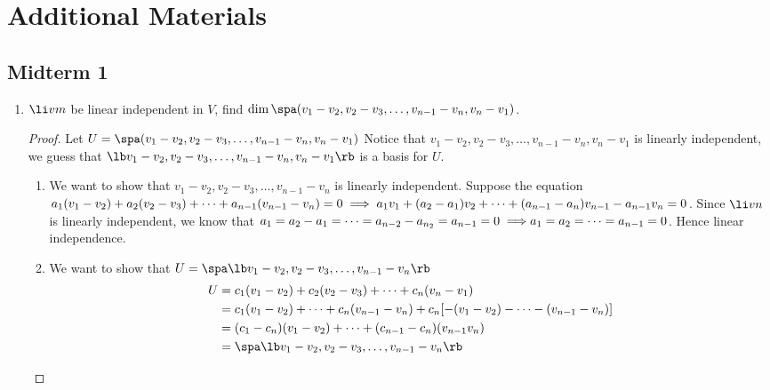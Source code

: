 \thispagestyle{empty}
\section*{Additional Materials}
\subsection*{Midterm 1}
\begin{enumerate}
    \item $\li vm$ be linear independent in $V$, find $\dim \spa (v_1 - v_2, v_2 - v_3, \ldots, v_{n-1} - v_n, v_n - v_1)$. 
    \begin{proof}
        Let $U = \spa ( v_1 - v_2, v_2 - v_3, \ldots, v_{n-1} - v_n, v_n - v_1 )$
        Notice that $v_1 - v_2, v_2 - v_3, \ldots, v_{n-1} - v_n, v_n - v_1$ is linearly independent, we guess that $\lb v_1 - v_2, v_2 - v_3, \ldots, v_{n-1} - v_n, v_n - v_1 \rb$ is a basis for $U$. 
        \begin{enumerate} [label = \textit{Step \arabic*.}]
                \item We want to show that $ v_1 - v_2, v_2 - v_3, \ldots, v_{n-1} - v_n$ is linearly independent. Suppose the equation  $a_1(v_1 - v_2) + a_2(v_2 - v_3) + \cdots + a_{n-1} (v_{n-1} - v_n) = 0\\ \implies a_1 v_1  + (a_2 - a_1) v_2 + \cdots + (a_{n-1} - a_n)v_{n-1} - a_{n-1} v_n = 0$. Since $\li vn$ is linearly independent, we know that $a_1 = a_2 - a_1 = \cdots = a_{n - 2} - a_{n_2} = a_{n-1} = 0 \implies \\ a_1 = a_2 = \cdots = a_{n-1} = 0$. Hence linear independence.
                \item We want to show that $U = \spa \lb  v_1 - v_2, v_2 - v_3, \ldots, v_{n-1} - v_n \rb$ 
                \begin{align*}
                    U &= c_1(v_1 - v_2) + c_2(v_2 - v_3) + \cdots + c_n(v_n - v_1) \\
                    &= c_1(v_1 - v_2) + \cdots + c_n(v_{n-1} - v_n) + c_n[-(v_1 - v_2) - \cdots - (v_{n-1} - v_n)] \\
                    &= (c_1 - c_n)(v_1 - v_2) + \cdots + (c_{n - 1} - c_n)(v_{n-1}v_n) \\
                    &= \spa \lb  v_1 - v_2, v_2 - v_3, \ldots, v_{n-1} - v_n \rb
                \end{align*}
        \end{enumerate}
    \end{proof}

\end{enumerate}
